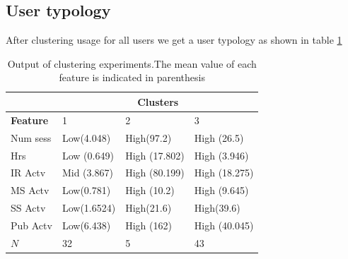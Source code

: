 \documentclass{acm_proc_article-sp}
\begin{document}

\subsection{User typology}

After clustering usage for all users we get a user typology as shown in table \ref{usertypology}
\begin{table}
\caption{Output of clustering experiments.The mean value of each feature is indicated in parenthesis}
\label{usertypology}
\begin{tabular}{|p{1.7cm}|p{1.6cm}|p{1.6cm}|p{1.6cm}|}
\hline
& \multicolumn{3}{c|}{\textbf{Clusters}}  \\ \hline
 \textbf{Feature} & 1 &  2 & 3 \\ 
\hline Num sess & Low(4.048)& High(97.2)  & High (26.5)  \\ 
\hline Hrs & Low (0.649) & High (17.802) & High (3.946)  \\ 
\hline IR Actv & Mid (3.867) & High (80.199) & High (18.275) \\ 
\hline MS Actv &  Low(0.781)  & High (10.2) & High (9.645)  \\ 
\hline SS Actv  & Low(1.6524) & High(21.6) & High(39.6) \\
\hline Pub Actv & Low(6.438) & High (162) & High (40.045)  \\
\hline \textbf{$N$} & 32 & 5 & 43 \\
\hline
\end{tabular}
\end{table} 
\end{document}

